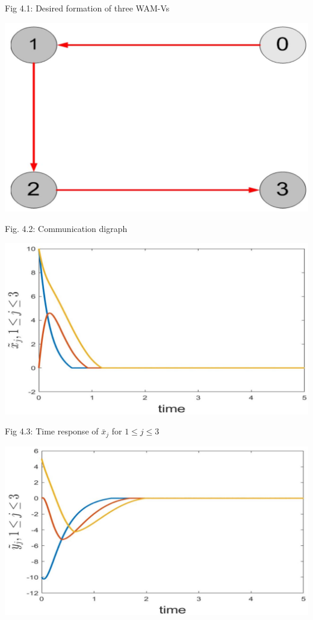 \documentclass[10pt]{article}
\begin{document}
Fig 4.1: Desired formation of three WAM-Vs

\begin{center}
\includegraphics[max width=\textwidth]{2023_10_07_53b70c7408bc8e139415g-66}
\end{center}

Fig. 4.2: Communication digraph

\begin{center}
\includegraphics[max width=\textwidth]{2023_10_07_53b70c7408bc8e139415g-67(1)}
\end{center}

Fig 4.3: Time response of $\bar{x}_{j}$ for $1 \leq j \leq 3$

\begin{center}
\includegraphics[max width=\textwidth]{2023_10_07_53b70c7408bc8e139415g-67}
\end{center}
\end{document}
